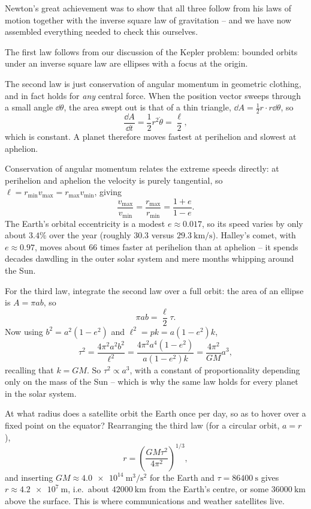 Newton's great achievement was to show that all three follow from his laws of motion together with the inverse square law of gravitation -- and we have now assembled everything needed to check this ourselves.

The first law follows from our discussion of the Kepler problem: bounded orbits under an inverse square law are ellipses with a focus at the origin.

The second law is just conservation of angular momentum in geometric clothing, and in fact holds for \emph{any} central force. When the position vector sweeps through a small angle $\dd\theta$, the area swept out is that of a thin triangle, $\dd A = \frac{1}{2}r \cdot r \dd\theta$, so
$$
\frac{\dd A}{\dd t} = \frac{1}{2}r^2 \dot{\theta} = \frac{\ell}{2},
$$
which is constant. A planet therefore moves fastest at perihelion and slowest at aphelion.

\begin{example}
	Conservation of angular momentum relates the extreme speeds directly: at perihelion and aphelion the velocity is purely tangential, so $\ell = r_{\min}v_{\max} = r_{\max}v_{\min}$, giving
	$$
	\frac{v_{\max}}{v_{\min}} = \frac{r_{\max}}{r_{\min}} = \frac{1 + e}{1 - e}.
	$$
	The Earth's orbital eccentricity is a modest $e \approx 0.017$, so its speed varies by only about $3.4\%$ over the year (roughly $30.3$ versus $\SI{29.3}{\kilo\meter\per\second}$). Halley's comet, with $e \approx 0.97$, moves about $66$ times faster at perihelion than at aphelion -- it spends decades dawdling in the outer solar system and mere months whipping around the Sun.
\end{example}

For the third law, integrate the second law over a full orbit: the area of an ellipse is $A = \pi a b$, so
$$
\pi a b = \frac{\ell}{2} \tau.
$$
Now using $b^2 = a^2 (1 - e^2)$ and $\ell^2 = pk = a(1 - e^2)k$,
$$
\tau^2 = \frac{4 \pi^2 a^2 b^2}{\ell^2} = \frac{4\pi^2 a^4 (1 - e^2)}{a(1-e^2)k} = \frac{4 \pi^2}{GM} a^3,
$$
recalling that $k = GM$. So $\tau^2 \propto a^3$, with a constant of proportionality depending only on the mass of the Sun -- which is why the same law holds for every planet in the solar system.

\begin{example}
	At what radius does a satellite orbit the Earth once per day, so as to hover over a fixed point on the equator? Rearranging the third law (for a circular orbit, $a = r$),
	$$
	r = \left(\frac{GM \tau^2}{4\pi^2}\right)^{1/3},
	$$
	and inserting $GM \approx \SI{4.0e14}{\meter\cubed\per\second\squared}$ for the Earth and $\tau = \SI{86400}{\second}$ gives $r \approx \SI{4.2e7}{\meter}$, i.e.\ about $\SI{42000}{\kilo\meter}$ from the Earth's centre, or some $\SI{36000}{\kilo\meter}$ above the surface. This is where communications and weather satellites live.
\end{example}

